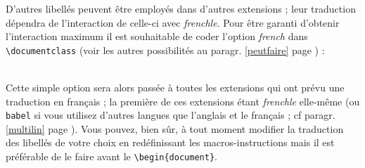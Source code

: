 \documentclass[a4paper,12pt,openright]{article}
\begin{document}
D’autres libellés peuvent être employés dans d’autres extensions ; leur traduction
dépendra de l’interaction de celle-ci avec \textit{frenchle}. Pour être garanti
d’obtenir l’interaction maximum il est souhaitable de coder l’option \textsl{french}
dans {\tt{\backslash}documentclass}
 (voir les autres possibilités au paragr. \ref{peutfaire} page \pageref{peutfaire}) :\\[1em]
\rule{0pt}{1em}\hfill{}\hfill\rule{0pt}{1em}\\[.5em]

Cette simple option sera alors passée à toutes les extensions qui ont prévu
une traduction en français ; la première de ces extensions étant \textit{frenchle} 
elle-même (ou \texttt{babel} si vous utilisez d’autres langues que l’anglais et le français ; cf
paragr.  \ref{multilin} page \pageref{multilin}).
Vous pouvez, bien sûr, à tout moment modifier la traduction des libellés de
votre choix en redéfinissant les macros-instructions mais il est préférable de le
faire avant le \texttt{{\backslash}begin\{document\}}.
\end{document}
